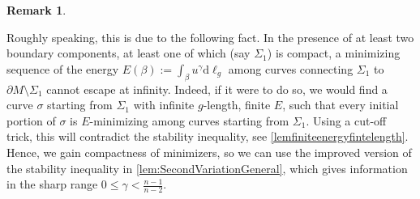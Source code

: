 \documentclass[12pt,a4paper,reqno]{amsart}
\theoremstyle{definition}
\newtheorem{remark}{Remark}
\renewcommand{\leq}{\leqslant}
\begin{document}
\begin{remark}
\begin{enumerate}
    Roughly speaking, this is due to the following fact. In the presence of at least two boundary components, at least one of which (say $\Sigma_1$) is compact, a minimizing sequence of the energy $E(\beta):=\int_\beta u^\gamma\mathrm{d}\ell_g$ among curves connecting $\Sigma_1$ to $\partial M\setminus\Sigma_1$ cannot escape at infinity. Indeed, if it were to do so, we would find a curve $\sigma$ starting from $\Sigma_1$ with infinite $g$-length, finite $E$, such that every initial portion of $\sigma$ is $E$-minimizing among curves starting from $\Sigma_1$. Using a cut-off trick, this will contradict the stability inequality, see \cref{lemfiniteenergyfintelength}. Hence, we gain compactness of minimizers, so we can use the improved version of the stability inequality in \cref{lem:SecondVariationGeneral}, which gives information in the sharp range $0\leq \gamma<\frac{n-1}{n-2}$.
    \end{enumerate}
\end{remark}
\smallskip
\end{document}
